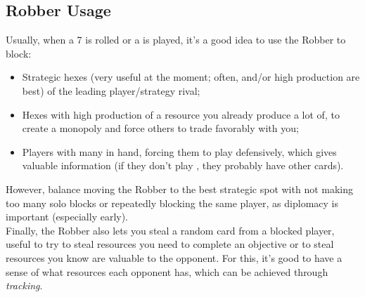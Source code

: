 \documentclass[12pt]{article}
\begin{document}
\newpage
\subsection{Robber Usage}
Usually, when a 7 is rolled or a  is played, it's a good idea to use the Robber to block:
\vspace{-0.1cm}
\begin{itemize}[noitemsep]
    \item Strategic hexes (very useful at the moment; often,  and/or high production are best) of the leading player/strategy rival;
    \item Hexes with high production of a resource you already produce a lot of, to create a monopoly and force others to trade favorably with you;
    \item Players with many  in hand, forcing them to play  defensively, which gives valuable information (if they don't play , they probably have other cards).
\end{itemize}
\vspace{-0.1cm}
However, balance moving the Robber to the best strategic spot with not making too many solo blocks or repeatedly blocking the same player, as diplomacy is important (especially early). \\
Finally, the Robber also lets you steal a random card from a blocked player, useful to try to steal resources you need to complete an objective or to steal resources you know are valuable to the opponent.
For this, it's good to have a sense of what resources each opponent has, which can be achieved through \textit{tracking}.
\end{document}
